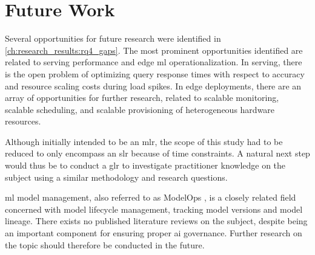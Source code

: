 \chapter{Future Work}
\label{ch:future_work}
Several opportunities for future research were identified in \cref{ch:research_results:rq4_gaps}.
The most prominent opportunities identified are related to serving performance and edge \acrshort{ml} operationalization.
In serving, there is the open problem of optimizing query response times with respect to accuracy and resource scaling costs during load spikes.
In edge deployments, there are an array of opportunities for further research, related to scalable monitoring, scalable scheduling, and scalable provisioning of heterogeneous hardware resources.

Although initially intended to be an \acrshort{mlr}, the scope of this study had to be reduced to only encompass an \acrshort{slr} because of time constraints.
A natural next step would thus be to conduct a \acrshort{glr} to investigate practitioner knowledge on the subject using a similar methodology and research questions.

\acrshort{ml} model management, also referred to as ModelOps \cite{Hummer2019}, is a closely related field concerned with model lifecycle management, tracking model versions and model lineage.
There exists no published literature reviews on the subject, despite being an important component for ensuring proper \acrshort{ai} governance.
Further research on the topic should therefore be conducted in the future.